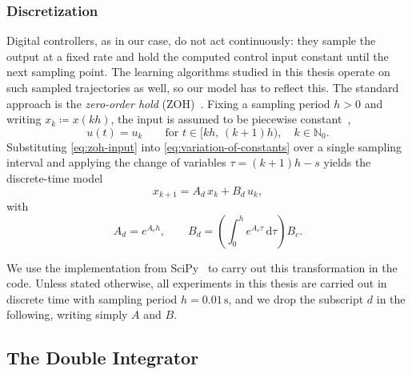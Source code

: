 \subsubsection{Discretization}
\label{subsubsec:discretization}
 
Digital controllers, as in our case, do not act continuously: they sample the output at a fixed
rate and hold the computed control input constant until the next sampling point. The
learning algorithms studied in this thesis operate on such sampled trajectories
as well, so our model has to reflect this. The standard approach is the
\emph{zero-order hold} (ZOH)~\cite[p.~118]{Werner2021Control}. Fixing a sampling period $h > 0$ and writing
$x_k \coloneqq x(kh)$, the input is assumed to be piecewise constant~\cite[Eq.~(7.1)]{Werner2021Control},
\begin{equation}
    \label{eq:zoh-input}
    u(t) = u_k \qquad \text{for } t \in [kh,\, (k+1)h), \quad k \in \mathbb{N}_0 .
\end{equation}
Substituting \eqref{eq:zoh-input} into \eqref{eq:variation-of-constants} over a
single sampling interval and applying the change of variables
$\tau = (k+1)h - s$ yields the discrete-time model
\begin{equation}
    \label{eq:ss-disc}
    x_{k+1} = A_d\, x_k + B_d\, u_k ,
\end{equation}
with~\cite[p.~136, Eqs.~(7.26)--(7.28)]{Werner2021Control}
\begin{equation}
    \label{eq:zoh-matrices}
    A_d = e^{A_c h},
    \qquad
    B_d = \left( \int_{0}^{h} e^{A_c \tau} \, \mathrm{d}\tau \right) B_c .
\end{equation}

We use the implementation from SciPy~\cite{SciPy2026ContDiscrete}
to carry out this transformation in the code. Unless stated otherwise, all experiments in this
thesis are carried out in discrete time with sampling period $h = 0.01\,\mathrm{s}$, and
we drop the subscript $d$ in the following, writing simply $A$ and $B$.
 
\subsection{The Double Integrator}
\label{subsec:double-integrator}
 
